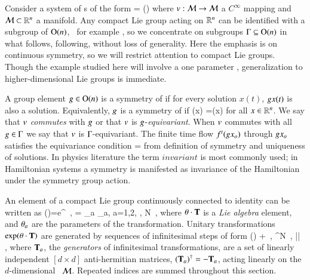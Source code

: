 

Consider a system of \ode s of the form
\beq
	\dot{\ssp} = \vf(\ssp)
	\label{eq:difeq}
\eeq
where $v: {\cal M} \rightarrow {\cal M}$ a $C^\infty$ mapping and ${\cal M}\subset\mathbb{R}^{n}$
a manifold. Any compact Lie group acting on $\mathbb{R}^{n}$ can be identified
with a subgroup of $\textrm{O}(n)$, \cf\ for example ,
so we concentrate on subgroups $\Gamma\subseteq\textrm{O}(n)$ in what
follows, following, without loss of generality.
%
Here the emphasis is on continuous symmetry, so we will
restrict attention to compact Lie groups. Though the example studied here
will involve a one parameter ,
generalization to higher-dimensional Lie groups is immediate.

A group element $g\in\textrm{O}(n)$ is a symmetry of
 if for every solution $x(t)$, $g x(t)$ is
also a solution. Equivalently, $g$ is a symmetry of
 if 
\beq
	\vf(\LieEl x) =\LieEl \vf(x)
	\label{eq:equiv} 
\eeq 
for all $x\in\mathbb{R}^{n}$. We say that
$v$ \emph{commutes} with $g$ or that $v$ is
$g$-\emph{equivariant}. When $v$ commutes with all
$g\in\Gamma$ we say that $v$ is $\Gamma$-equivariant.
The finite time flow ${f^{t}(g x_o)}$ through $g
x_o$ satisfies the equivariance condition
\beq\label{eq:equivFinite} 
=\LieEl{} 
\eeq 
from definition of symmetry and
uniqueness of solutions. In physics literature the term
$invariant$ is most commonly used; in
Hamiltonian systems a symmetry is manifested as invariance of the
Hamiltonian under the symmetry group action.


An element of a compact Lie group
continuously connected to identity can be written as
\beq
\LieEl(\gSpace)=e^{\gSpace \cdot \Lg }
	\,,\qquad
\gSpace \cdot \Lg  = \sum \gSpace_a \Lg_a,\; a=1,2, \cdots, N
\,,
where
${\bf \theta} \cdot \mathbf{T}$
is a {\em Lie algebra} element,  and ${\bf \theta}_a$ are the parameters
of the transformation.
{Unitary} transformations $ \exp({\bf \theta} \cdot {\ensuremath{\mathbf{T}}}) $ are
generated by sequences of infinitesimal steps of form
\beq
\LieEl(\delta\gSpace)  + \delta \gSpace \cdot \Lg
    \,,\quad
\delta\gSpace \in \reals^N
    \,,\quad
|\delta \gSpace| 
    \, ,
where $\mathbf{T}_a$, the {\em generators} of infinitesimal
transformations, are a set of linearly independent
$[d\!\times\!d]$ anti-hermitian matrices, $(\mathbf{T}_a)^\dagger =
- \mathbf{T}_a$, acting linearly on the $d$-dim\-ens\-ion\-al \statesp\
${\cal M}$. Repeated indices are summed throughout this section.

